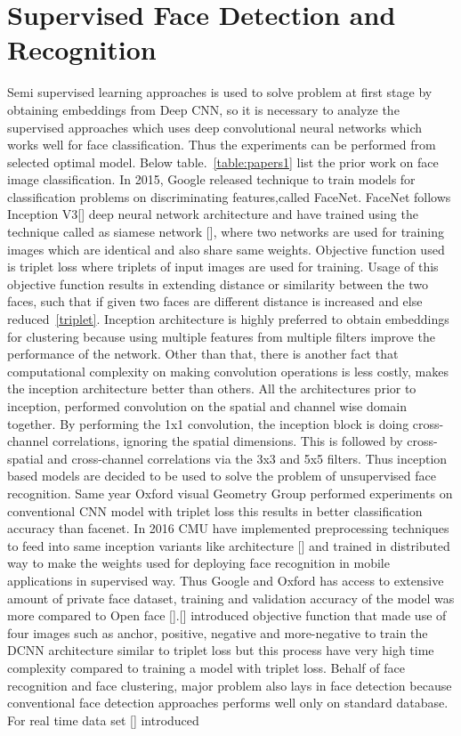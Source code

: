 \documentclass[a4paper,12pt, twoside]{NITKReport}
\begin{document}
\section{Supervised Face Detection and Recognition}
\par Semi supervised learning approaches is used to solve problem at first stage by obtaining embeddings from Deep CNN, so it is necessary to analyze the supervised approaches which uses deep convolutional neural networks which works well for face classification. Thus the experiments can be performed from selected optimal model. Below table.~\ref{table:papers1} list the prior work on face image classification. In 2015, Google released technique to train models for classification problems on discriminating features,called FaceNet. FaceNet follows Inception V3[\cite{DBLP:journals/corr/SzegedyVISW15}] deep neural network architecture and have trained using the technique called as siamese network [\cite{Koch2015SiameseNN}], where two networks are used for training images which are identical and also share same weights. Objective function used is triplet loss where triplets of input images are used for training. Usage of this objective function results in extending distance or similarity between the two faces, such that if given two faces are different distance is increased and else reduced~\ref{triplet}. Inception architecture is highly preferred to obtain embeddings for clustering because using multiple features from multiple filters improve the performance of the network. Other than that, there is another fact that computational complexity on making convolution operations is less costly, makes the inception architecture better than others. All the architectures prior to inception, performed convolution on the spatial and channel wise domain together. By performing the 1x1 convolution, the inception block is doing cross-channel correlations, ignoring the spatial dimensions. This is followed by cross-spatial and cross-channel correlations via the 3x3 and 5x5 filters. Thus inception based models are decided to be used to solve the problem of unsupervised face recognition. Same year Oxford visual Geometry Group performed experiments on conventional CNN model with triplet loss this results in better classification accuracy than facenet. In 2016 CMU have implemented preprocessing techniques to feed into same inception variants like architecture [\cite{amos2016openface}] and trained in distributed way to make the weights used for deploying face recognition in mobile applications in supervised way. Thus Google and Oxford has access to extensive amount of private face dataset, training and validation accuracy of the model was more compared to Open face [\cite{amos2016openface}].[\cite{chen2017beyond}] introduced objective function that made use of four images such as anchor, positive, negative and more-negative to train the DCNN architecture similar to triplet loss but this process have very high time complexity compared to training a model with triplet loss. Behalf of face recognition and face clustering, major problem also lays in face detection because conventional face detection approaches performs well only on standard database. For real time data set [\cite{zhang2016joint}] introduced 
\end{document}
